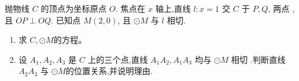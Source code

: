 \documentclass[class=ctexart,crop=false]{standalone}
\begin{document}
抛物线 $C$ 的顶点为坐标原点 $O$. 焦点在 $x$ 轴上,直线 $l:x=1$
交 $C$ 于 $P,Q$, 两点 ,且 $OP \perp OQ$. 已知点 $M(2,0)$,
且 $\odot M$ 与 $l$ 相切.
\begin{enumerate}[label=(\arabic*)]
    \item 求 $C,\odot M$的方程。
    \item 设 $A_1,A_2,A_3$ 是 $C$ 上的三个点,直线 $A_1A_2,A_1A_3$
          均与 $\odot M$ 相切 .判断直线 $A_2A_3$ 与 $\odot M$的位置关系,并说明理由.
\end{enumerate}
\end{document}

